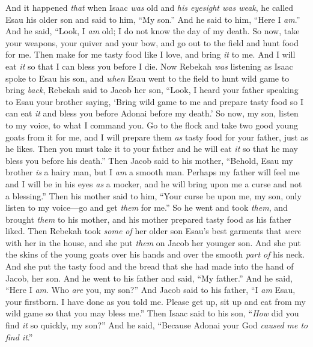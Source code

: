 \begin{biblechapter} %
 And it happened \textit{that} when Isaac \textit{was} old and \textit{his eyesight was weak}, he called Esau his older son and said to him, “My son.” And he said to him, “Here I \textit{am}.”
\verse And he said, “Look, I \textit{am} old; I do not know the day of my death.
\verse So now, take your weapons, your quiver and your bow, and go out to the field and hunt food for me.
\verse Then make for me tasty food like I love, and bring \textit{it} to me. And I will eat \textit{it} so that I can bless you before I die.
\verse Now Rebekah \textit{was} listening as Isaac spoke to Esau his son, and \textit{when} Esau went to the field to hunt wild game to bring \textit{back},
\verse Rebekah said to Jacob her son, “Look, I heard your father speaking to Esau your brother saying,
\verse ‘Bring wild game to me and prepare tasty food so I can eat \textit{it} and bless you before Adonai before my death.’
\verse So now, my son, listen to my voice, to what I command you.
\verse Go to the flock and take two good young goats from it for me, and I will prepare them \textit{as} tasty food for your father, just as he likes.
\verse Then you must take it to your father and he will eat \textit{it} so that he may bless you before his death.”
\verse Then Jacob said to his mother, “Behold, Esau my brother \textit{is} a hairy man, but I \textit{am} a smooth man.
\verse Perhaps my father will feel me and I will be in his eyes \textit{as} a mocker, and he will bring upon me a curse and not a blessing.”
\verse Then his mother said to him, “Your curse be upon me, my son, only listen to my voice—go and get \textit{them} for me.”
\verse So he went and took \textit{them}, and brought \textit{them} to his mother, and his mother prepared tasty food as his father liked.
\verse Then Rebekah took \textit{some of} her older son Esau’s best garments that \textit{were} with her in the house, and she put \textit{them} on Jacob her younger son.
\verse And she put the skins of the young goats over his hands and over the smooth \textit{part of} his neck.
\verse And she put the tasty food and the bread that she had made into the hand of Jacob, her son.
\verse And he went to his father and said, “My father.” And he said, “Here I \textit{am}. Who \textit{are} you, my son?”
\verse And Jacob said to his father, “I \textit{am} Esau, your firstborn. I have done as you told me. Please get up, sit up and eat from my wild game so that you may bless me.”
\verse Then Isaac said to his son, “\textit{How} did you find \textit{it} so quickly, my son?” And he said, “Because Adonai your God \textit{caused me to find it}.”

\end{biblechapter}
